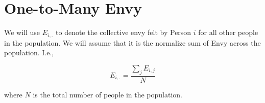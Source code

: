 \section{One-to-Many Envy}

We will use $E_{i,.}$ to denote the collective envy felt by Person $i$ for all other people in the population. We will assume that it is the normalize sum of Envy across the population. I.e.,

\begin{equation}
    E_{i,.} = \frac{\sum_{j} E_{i,j}}{N}
\end{equation}

where $N$ is the total number of people in the population.


